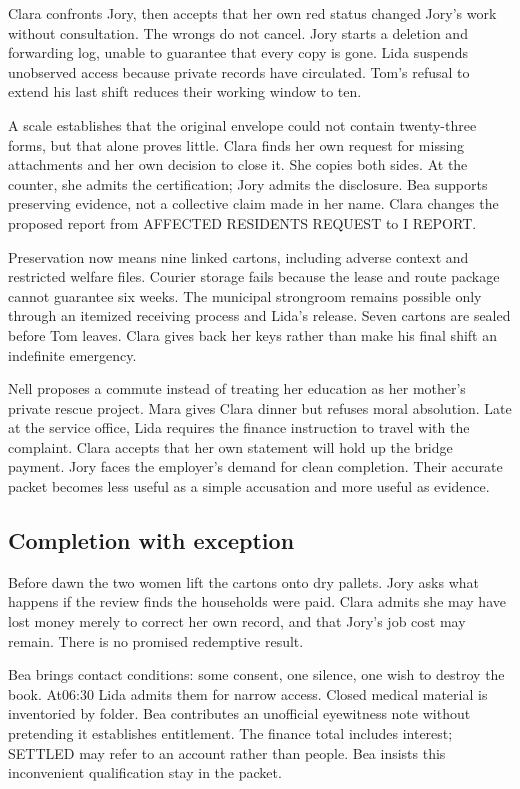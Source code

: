 Clara confronts Jory, then accepts that her own red status changed Jory's work without consultation. The wrongs do not cancel. Jory starts a deletion and forwarding log, unable to guarantee that every copy is gone. Lida suspends unobserved access because private records have circulated. Tom's refusal to extend his last shift reduces their working window to ten.

A scale establishes that the original envelope could not contain twenty-three forms, but that alone proves little. Clara finds her own request for missing attachments and her own decision to close it. She copies both sides. At the counter, she admits the certification; Jory admits the disclosure. Bea supports preserving evidence, not a collective claim made in her name. Clara changes the proposed report from AFFECTED RESIDENTS REQUEST to I REPORT.

Preservation now means nine linked cartons, including adverse context and restricted welfare files. Courier storage fails because the lease and route package cannot guarantee six weeks. The municipal strongroom remains possible only through an itemized receiving process and Lida's release. Seven cartons are sealed before Tom leaves. Clara gives back her keys rather than make his final shift an indefinite emergency.

Nell proposes a commute instead of treating her education as her mother's private rescue project. Mara gives Clara dinner but refuses moral absolution. Late at the service office, Lida requires the finance instruction to travel with the complaint. Clara accepts that her own statement will hold up the bridge payment. Jory faces the employer's demand for clean completion. Their accurate packet becomes less useful as a simple accusation and more useful as evidence.

\subsection{Completion with exception}
Before dawn the two women lift the cartons onto dry pallets. Jory asks what happens if the review finds the households were paid. Clara admits she may have lost money merely to correct her own record, and that Jory's job cost may remain. There is no promised redemptive result.

Bea brings contact conditions: some consent, one silence, one wish to destroy the book. At06:30 Lida admits them for narrow access. Closed medical material is inventoried by folder. Bea contributes an unofficial eyewitness note without pretending it establishes entitlement. The finance total includes interest; SETTLED may refer to an account rather than people. Bea insists this inconvenient qualification stay in the packet.

